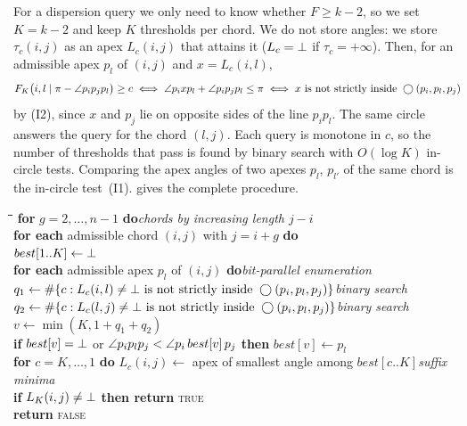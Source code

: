 For a dispersion query we only need to know whether $F\ge k-2$, so we set
$K=k-2$ and keep $K$ thresholds per chord. We do not store angles: we store
$\tau_c(i,j)$ as an apex $L_c(i,j)$ that attains it ($L_c=\bot$ if
$\tau_c=+\infty$). Then, for an admissible apex $p_l$ of $(i,j)$ and
$x=L_c(i,l)$,
\[
F_K\bigl(i,l\mid\pi-\angle p_ip_jp_l\bigr)\ge c
\iff \angle p_ixp_l+\angle p_ip_jp_l\le\pi
\iff x\text{ is not strictly inside }\bigcirc(p_i,p_l,p_j)
\]
by (I2), since $x$ and $p_j$ lie on opposite sides of the line $p_ip_l$. The
same circle answers the query for the chord $(l,j)$. Each query is monotone in
$c$, so the number of thresholds that pass is found by binary search with
$O(\log K)$ in-circle tests. Comparing the apex angles of two apexes $p_l$,
$p_{l'}$ of the same chord is the in-circle test~(I1). 
gives the complete procedure.

\begin{algorithm}
\caption{$\AlgCapped(P,k,r)$\quad ($k\ge3$, $K=k-2$)}\label{alg:capped}
\begin{tabbing}
\hspace{1.4em}\=\hspace{1.4em}\=\hspace{1.4em}\=\hspace{1.4em}\=\kill
\textbf{for} $g=2,\dots,n-1$ \textbf{do}\` \emph{chords by increasing length $j-i$}\\
\>\textbf{for each} admissible chord $(i,j)$ with $j=i+g$ \textbf{do}\\
\>\>$best[1..K]\gets\bot$\\
\>\>\textbf{for each} admissible apex $p_l$ of $(i,j)$ \textbf{do}\` \emph{bit-parallel enumeration}\\
\>\>\>$q_1\gets\#\{c: L_c(i,l)\ne\bot\text{ is not strictly inside }\bigcirc(p_i,p_l,p_j)\}$\` \emph{binary search}\\
\>\>\>$q_2\gets\#\{c: L_c(l,j)\ne\bot\text{ is not strictly inside }\bigcirc(p_i,p_l,p_j)\}$\` \emph{binary search}\\
\>\>\>$v\gets\min(K,1+q_1+q_2)$\\
\>\>\>\textbf{if} $best[v]=\bot$ or $\angle p_ip_lp_j<\angle p_i\,best[v]\,p_j$ \textbf{then} $best[v]\gets p_l$\\
\>\>\textbf{for} $c=K,\dots,1$ \textbf{do} $L_c(i,j)\gets$ apex of smallest angle among $best[c..K]$\` \emph{suffix minima}\\
\>\>\textbf{if} $L_K(i,j)\ne\bot$ \textbf{then return} \textsc{true}\\
\textbf{return} \textsc{false}
\end{tabbing}
\end{algorithm}

